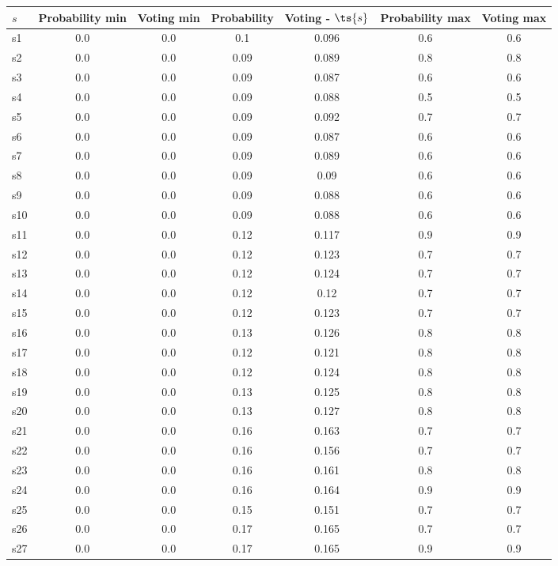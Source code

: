 \documentclass{article}
\begin{document}
\noindent\begin{tabular}{|l|c|c|c|c|c|c|}
\hline
$s$& Probability min & Voting min & Probability & Voting - $\ts{s}$ & Probability max & Voting max\\
\hline
s1 &0.0 & 0.0 & 0.1 & 0.096 & 0.6 & 0.6\\
\hline
s2 &0.0 & 0.0 & 0.09 & 0.089 & 0.8 & 0.8\\
\hline
s3 &0.0 & 0.0 & 0.09 & 0.087 & 0.6 & 0.6\\
\hline
s4 &0.0 & 0.0 & 0.09 & 0.088 & 0.5 & 0.5\\
\hline
s5 &0.0 & 0.0 & 0.09 & 0.092 & 0.7 & 0.7\\
\hline
s6 &0.0 & 0.0 & 0.09 & 0.087 & 0.6 & 0.6\\
\hline
s7 &0.0 & 0.0 & 0.09 & 0.089 & 0.6 & 0.6\\
\hline
s8 &0.0 & 0.0 & 0.09 & 0.09 & 0.6 & 0.6\\
\hline
s9 &0.0 & 0.0 & 0.09 & 0.088 & 0.6 & 0.6\\
\hline
s10 &0.0 & 0.0 & 0.09 & 0.088 & 0.6 & 0.6\\
\hline
s11 &0.0 & 0.0 & 0.12 & 0.117 & 0.9 & 0.9\\
\hline
s12 &0.0 & 0.0 & 0.12 & 0.123 & 0.7 & 0.7\\
\hline
s13 &0.0 & 0.0 & 0.12 & 0.124 & 0.7 & 0.7\\
\hline
s14 &0.0 & 0.0 & 0.12 & 0.12 & 0.7 & 0.7\\
\hline
s15 &0.0 & 0.0 & 0.12 & 0.123 & 0.7 & 0.7\\
\hline
s16 &0.0 & 0.0 & 0.13 & 0.126 & 0.8 & 0.8\\
\hline
s17 &0.0 & 0.0 & 0.12 & 0.121 & 0.8 & 0.8\\
\hline
s18 &0.0 & 0.0 & 0.12 & 0.124 & 0.8 & 0.8\\
\hline
s19 &0.0 & 0.0 & 0.13 & 0.125 & 0.8 & 0.8\\
\hline
s20 &0.0 & 0.0 & 0.13 & 0.127 & 0.8 & 0.8\\
\hline
s21 &0.0 & 0.0 & 0.16 & 0.163 & 0.7 & 0.7\\
\hline
s22 &0.0 & 0.0 & 0.16 & 0.156 & 0.7 & 0.7\\
\hline
s23 &0.0 & 0.0 & 0.16 & 0.161 & 0.8 & 0.8\\
\hline
s24 &0.0 & 0.0 & 0.16 & 0.164 & 0.9 & 0.9\\
\hline
s25 &0.0 & 0.0 & 0.15 & 0.151 & 0.7 & 0.7\\
\hline
s26 &0.0 & 0.0 & 0.17 & 0.165 & 0.7 & 0.7\\
\hline
s27 &0.0 & 0.0 & 0.17 & 0.165 & 0.9 & 0.9\\

\end{tabular}
\end{document}
